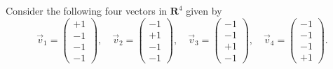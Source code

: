 \documentclass[a4paper,11pt]{article}
\newcommand{\R}{\mathbf{R}}
\begin{document}
 Consider the following four vectors in $\R^4$
given by
\[
  \vec v_1 = \begin{pmatrix}+1 \\ -1 \\ -1 \\ -1\end{pmatrix},  \quad
  \vec v_2 = \begin{pmatrix}-1 \\ +1 \\ -1 \\ -1\end{pmatrix}, \quad
  \vec v_3 = \begin{pmatrix}-1 \\ -1 \\ +1 \\ -1\end{pmatrix}, \quad
  \vec v_4 = \begin{pmatrix}-1 \\ -1 \\ -1 \\ +1\end{pmatrix}.
\]
\end{document}
